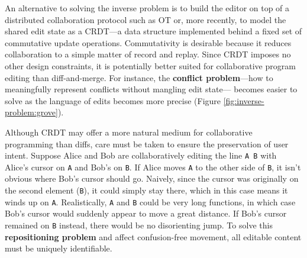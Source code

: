 An alternative to solving the inverse problem is to build the editor on top of a distributed collaboration protocol such as OT or,
more recently, to model the shared edit state as a CRDT---a data structure implemented behind a fixed set of commutative update operations.
Commutativity is desirable because it reduces collaboration to a simple matter of record and replay.
Since CRDT imposes no other design constraints, it is potentially better suited for collaborative program editing than diff-and-merge.
For instance, the \textbf{conflict problem}---how to meaningfully represent conflicts without mangling edit state---%
becomes easier to solve as the language of edits becomes more precise (Figure \ref{fig:inverse-problem:grove}).

Although CRDT may offer a more natural medium for collaborative programming than diffs,
care must be taken to ensure the preservation of user intent.
Suppose Alice and Bob are collaboratively editing the line \verb|A B| with Alice's cursor on \verb|A| and Bob's on \verb|B|.
If Alice moves \verb|A| to the other side of \verb|B|, it isn't obvious where Bob's cursor should go.
Naively, since the cursor was originally on the second element (\verb|B|), it could simply stay there,
which in this case means it winds up on \verb|A|.
Realistically, \verb|A| and \verb|B| could be very long functions, in which case Bob's cursor would suddenly appear to move a great distance.
If Bob's cursor remained on \verb|B| instead, there would be no disorienting jump.
To solve this \textbf{repositioning problem} and affect confusion-free movement, all editable content must be uniquely identifiable.




